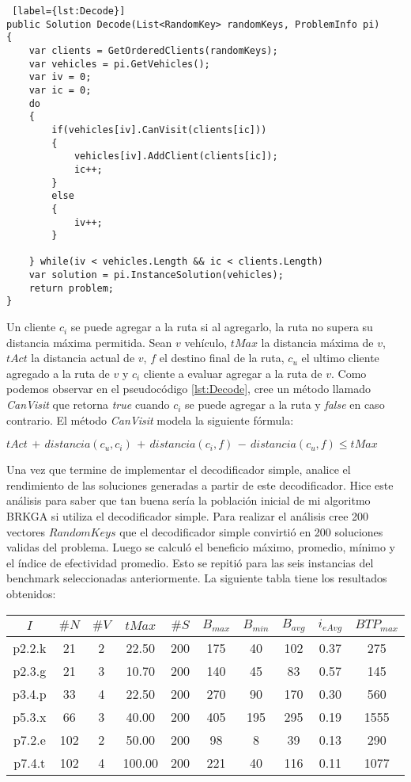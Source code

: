 \bigskip

\begin{lstlisting} [label={lst:Decode}]
public Solution Decode(List<RandomKey> randomKeys, ProblemInfo pi)
{
	var clients = GetOrderedClients(randomKeys);
	var vehicles = pi.GetVehicles();	
	var iv = 0;
	var ic = 0;	
	do
	{
		if(vehicles[iv].CanVisit(clients[ic]))
		{
			vehicles[iv].AddClient(clients[ic]);
			ic++;
		}
		else
		{
			iv++;			
		}
		
	} while(iv < vehicles.Length && ic < clients.Length)	
	var solution = pi.InstanceSolution(vehicles);
	return problem;
}
\end{lstlisting}

Un cliente $c_i$ se puede agregar a la ruta si al agregarlo, la ruta no supera su distancia máxima permitida. Sean $v$ vehículo, $tMax$ la distancia máxima de $v$, $tAct$ la distancia actual de $v$, $f$ el destino final de la ruta, $c_u$ el ultimo cliente agregado a la ruta de $v$ y $c_i$ cliente a evaluar agregar a la ruta de $v$. Como podemos observar en el pseudocódigo \ref{lst:Decode}, cree un método llamado \textit{CanVisit} que retorna \textit{true} cuando $c_i$ se puede agregar a la ruta y \textit{false} en caso contrario. El método \textit{CanVisit} modela la siguiente fórmula:

\bigskip

\( tAct\, +\, distancia(c_u, c_i)\, +\, distancia(c_i, f)\, -\, distancia(c_u, f) \leq tMax\)

\bigskip

Una vez que termine de implementar el decodificador simple, analice el rendimiento de las soluciones generadas a partir de este decodificador. Hice este análisis para saber que tan buena sería la población inicial de mi algoritmo BRKGA si utiliza el decodificador simple. Para realizar el análisis cree 200 vectores $RandomKeys$ que el decodificador simple convirtió en 200 soluciones validas del problema. Luego se calculó el beneficio máximo, promedio, mínimo y el índice de efectividad promedio. Esto se repitió para las seis instancias del benchmark seleccionadas anteriormente. La siguiente tabla tiene los resultados obtenidos:

\begin{center}
\begin{tabular}{ |c|c|c|c|c|c|c|c|c|c| } 
\hline
$I$ & $\#N$ & $\#V$ & $tMax$ & $\#S$ & $B_{max}$ & $B_{min}$ & $B_{avg}$ & $i_{eAvg}$ & $BTP_{max}$ \\
\hline
p2.2.k & 21 & 2 & 22.50 & 200 & 175 & 40 & 102 & 0.37 & 275  \\
p2.3.g & 21 & 3 & 10.70 & 200 & 140 & 45 & 83 & 0.57 & 145  \\
p3.4.p & 33 & 4 & 22.50 & 200 & 270 & 90 & 170 & 0.30 & 560  \\
p5.3.x & 66 & 3 & 40.00 & 200 & 405 & 195 & 295 & 0.19 & 1555  \\
p7.2.e & 102 & 2 & 50.00 & 200 & 98 & 8 & 39 & 0.13 & 290  \\
p7.4.t & 102 & 4 & 100.00 & 200 & 221 & 40 & 116 & 0.11 & 1077  \\
\hline
\end{tabular}
\end{center}

